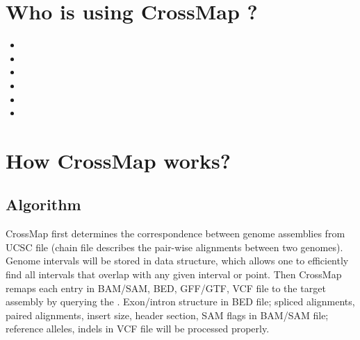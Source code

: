 \documentclass[letterpaper,10pt,english]{sphinxmanual}
\let\sphinxpxdimen\pdfpxdimen\else\newdimen\sphinxpxdimen
\begin{document}
\chapter{Who is using CrossMap ?}
\label{\detokenize{index:who-is-using-crossmap}}\begin{itemize}
\item {} 

\item {} 

\item {} 

\item {} 

\item {} 

\item {} 

\end{itemize}


\chapter{How CrossMap works?}
\label{\detokenize{index:how-crossmap-works}}
\noindent\scalebox{0.850000}{\sphinxincludegraphics[width=600\sphinxpxdimen,height=250\sphinxpxdimen]{{howitworks}.png}}


\section{Algorithm}
\label{\detokenize{index:algorithm}}
CrossMap first determines the correspondence between genome assemblies from
UCSC  file (chain file
describes the pair-wise alignments between two genomes). Genome intervals will be stored in
 data structure,
which  allows one to efficiently find all intervals that overlap with any given interval or point.
Then CrossMap remaps each entry in BAM/SAM, BED, GFF/GTF, VCF file to the target assembly by querying the .
Exon/intron structure in BED file; spliced alignments, paired alignments, insert size, header
section, SAM flags in BAM/SAM file; reference alleles, indels in VCF file will be processed
properly.
\end{document}
